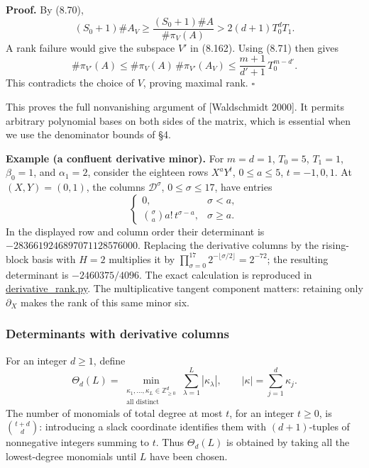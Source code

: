 \documentclass[
  11pt,
  a4paper,
]{article}
\begin{document}
\textbf{Proof.} By (8.70), \[
(S_0+1)\#A_V
\ge\frac{(S_0+1)\#A}{\#\pi_V(A)}
>2(d+1)T_0^dT_1.
\] A rank failure would give the subspace \(V'\) in (8.162). Using
(8.71) then gives \[
\#\pi_{V'}(A)
\le\#\pi_V(A)\,\#\pi_{V'}(A_V)
\le\frac{m+1}{d'+1}\,T_0^{m-d'}.
\] This contradicts the choice of \(V\), proving maximal rank.
\(\square\)

This proves the full nonvanishing argument of {[}Waldschmidt 2000{]}. It
permits arbitrary polynomial bases on both sides of the matrix, which is
essential when we use the denominator bounds of §4.

\textbf{Example (a confluent derivative minor).} For \(m=d=1\),
\(T_0=5\), \(T_1=1\), \(\beta_0=1\), and \(\alpha_1=2\), consider the
eighteen rows \(X^aY^t\), \(0\le a\le5\), \(t=-1,0,1\). At
\((X,Y)=(0,1)\), the columns \(\mathcal D^\sigma\), \(0\le\sigma\le17\),
have entries \[
\begin{cases}
0,&\sigma<a,\\
\binom{\sigma}{a}a!\,t^{\sigma-a},&\sigma\ge a.
\end{cases}
\] In the displayed row and column order their determinant is
\(-2836619246897071128576000\). Replacing the derivative columns by the
rising-block basis with \(H=2\) multiplies it by
\(\prod_{\sigma=0}^{17}2^{-\lfloor\sigma/2\rfloor}=2^{-72}\); the
resulting determinant is \(-2460375/4096\). The exact calculation is
reproduced in
\href{https://kokunoyumeto.github.io/open-math-courses-public/courses/TR-BAKER/verification/derivative_rank.py}{derivative\_rank.py}. The
multiplicative tangent component matters: retaining only \(\partial_X\)
makes the rank of this same minor six.

\subsubsection{Determinants with derivative
columns}\label{determinants-with-derivative-columns}

For an integer \(d\ge1\), define \[
\Theta_d(L)=
\min_{\substack{\kappa_1,\ldots,\kappa_L\in\mathbb Z_{\ge0}^d\\
                 \text{all distinct}}}
\sum_{\lambda=1}^L|\kappa_\lambda|,
\qquad |\kappa|=\sum_{j=1}^d\kappa_j.
\] The number of monomials of total degree at most \(t\), for an integer
\(t\ge0\), is \(\binom{t+d}{d}\): introducing a slack coordinate
identifies them with \((d+1)\)-tuples of nonnegative integers summing to
\(t\). Thus \(\Theta_d(L)\) is obtained by taking all the lowest-degree
monomials until \(L\) have been chosen.
\end{document}
